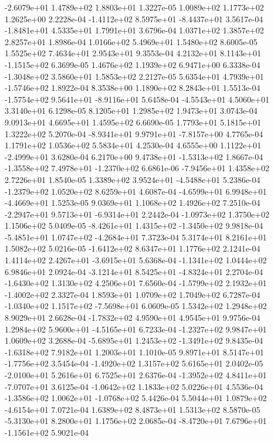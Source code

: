 -2.6079e+01  1.4789e+02  1.8803e+01  1.3227e-05
1.0089e+02 1.1773e+02 1.2625e+00  2.2228e-04
-1.4112e+02  8.5975e+01 -8.4437e+01  3.5617e-04
-1.8481e+01  4.5335e+01  1.7991e+01  3.6796e-04
1.0371e+02 1.3857e+02 2.8257e+01  1.8986e-04
1.0166e+02 5.4969e+01 1.5480e+02  8.6005e-05
1.5525e+02 7.4634e+01 2.9543e+01  9.3553e-04
 4.2132e+01  8.1143e+01 -1.1515e+02  6.3699e-05
1.4676e+02 1.1939e+02 6.9471e+00  6.3338e-04
-1.3048e+02  3.5860e+01  1.5853e+02  2.2127e-05
 5.6354e+01  4.7939e+01 -1.5746e+02  1.8922e-04
8.3538e+00 1.1890e+02 8.2843e+01  1.5513e-04
-1.5754e+02  9.5641e+01 -8.9116e+01  5.6458e-04
-4.5543e+01  4.5060e+01  3.3140e+01  6.1298e-05
8.1205e+01 1.2985e+02 1.9473e+01  3.0743e-04
9.0913e+01 4.6695e+01 1.4595e+02  6.6690e-05
1.7793e+01 5.1815e+01 1.3222e+02  5.2070e-04
-8.9341e+01  9.9791e+01 -7.8157e+00  4.7765e-04
1.1791e+02 1.0536e+02 5.5834e+01  4.2530e-04
 4.6555e+00  1.1122e+01 -2.4999e+01  3.6280e-04
 6.2170e+00  9.4738e+01 -1.5313e+02  1.8667e-04
-1.3558e+02  7.4978e+01 -1.2370e+02  6.6861e-06
-7.9456e+01  1.4358e+02  2.7226e+01  1.8540e-05
 1.3389e+02  3.9524e+01 -4.5488e+01  5.2386e-04
-1.2379e+02  1.0520e+02  8.6259e+01  4.6087e-04
-4.6599e+01  6.9948e+01 -4.4669e+01  1.5253e-05
9.0369e+01 1.1068e+02 1.4926e+02  7.2510e-04
-2.2947e+01  9.5713e+01 -6.9314e+01  2.2442e-04
-1.0973e+02  1.3750e+02  1.1506e+02  5.0409e-05
-8.4261e+01  1.4315e+02 -1.3450e+02  9.9818e-04
-5.4851e+01  1.0747e+02 -4.2684e+01  7.3723e-04
5.3174e+01 8.2161e+01 1.5082e+02  5.0216e-05
-1.6412e+02  8.6347e+01  1.1776e+02  2.1241e-04
 1.4114e+02  2.4267e+01 -3.6915e+01  5.6368e-04
-1.1341e+02  1.0444e+02  6.9846e+01  2.0924e-04
-3.1214e+01  8.5425e+01 -4.8324e+01  2.2704e-04
-1.6430e+02  1.3130e+02  4.2506e+01  7.6560e-04
-1.5799e+02  2.1932e+01 -1.4002e+02  2.3327e-04
1.8593e+01 1.0709e+02 1.7049e+02  6.7287e-04
-1.0340e+02  1.1517e+02 -7.5698e+01  6.0609e-05
1.5342e+02 1.2948e+02 8.9029e+01  2.6628e-04
-1.7832e+02  4.9590e+01  4.9545e+01  9.9756e-04
 1.2984e+02  5.9600e+01 -4.5165e+01  6.7233e-04
-1.2327e+02  9.9847e+01  1.0609e+02  3.2688e-04
-5.6895e+01  1.2453e+02 -1.3491e+02  9.8435e-04
-1.6318e+02  7.9182e+01  1.2003e+01  1.1010e-05
 9.8971e+01  8.5147e+01 -1.7756e+02  3.5454e-04
-1.4920e+02  1.3157e+02  5.6165e+01  2.0402e-05
-2.0100e+01  5.2616e+01  6.7525e+01  2.6376e-04
-1.3952e+02  4.8411e+01 -7.0707e+01  3.6125e-04
-1.0642e+02  1.1833e+02  5.0226e+01  4.5536e-04
-1.3586e+02  1.0062e+01 -1.0768e+02  5.4426e-04
 5.5044e+01  1.0879e+02 -4.6154e+01  7.0721e-04
1.6389e+02 8.4873e+01 1.5313e+02  8.5870e-05
-5.3130e+01  8.2800e+01  1.1756e+02  2.0685e-04
-8.4720e+01  7.6796e+01 -1.1561e+02  5.9021e-04
